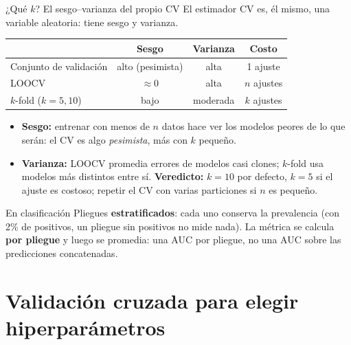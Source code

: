 \documentclass{beamer}
\newcommand{\1}{\mathbb{I}}
\begin{document}
\begin{frame}{¿Qué $k$? El sesgo--varianza del propio CV}
\small
El estimador CV es, él mismo, una variable aleatoria: tiene sesgo y varianza.
\begin{center}
\footnotesize
\setlength{\tabcolsep}{5pt}
\begin{tabular}{lccc}
\hline
 & Sesgo & Varianza & Costo \\
\hline
Conjunto de validación & alto (pesimista) & alta & 1 ajuste \\
LOOCV & $\approx 0$ & alta & $n$ ajustes \\
$k$-fold ($k = 5, 10$) & bajo & moderada & $k$ ajustes \\
\hline
\end{tabular}
\end{center}
\pause
\begin{itemize}\itemsep3pt
  \item \textbf{Sesgo:} entrenar con menos de $n$ datos hace ver los modelos peores de lo que serán: el CV es algo \emph{pesimista}, más con $k$ pequeño.
  \item \textbf{Varianza:} LOOCV promedia errores de modelos casi clones; $k$-fold usa modelos más distintos entre sí. \textbf{Veredicto:} $k = 10$ por defecto, $k = 5$ si el ajuste es costoso; repetir el CV con varias particiones si $n$ es pequeño. \pause
\end{itemize}
\begin{block}{En clasificación}
Pliegues \textbf{estratificados}: cada uno conserva la prevalencia (con 2\% de positivos, un pliegue sin positivos no mide nada). La métrica se calcula \textbf{por pliegue} y luego se promedia: una AUC por pliegue, no una AUC sobre las predicciones concatenadas.
\end{block}
\end{frame}


\section{Validación cruzada para elegir hiperparámetros}
\begin{frame}[noframenumbering]
\tableofcontents[currentsection]
\end{frame}
\end{document}
